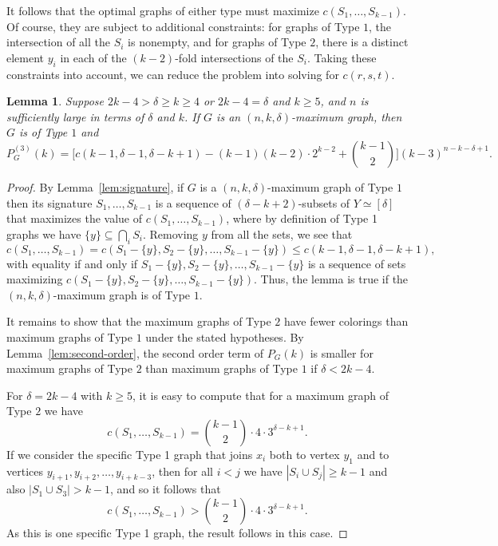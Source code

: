 \documentclass[11pt]{article}
\theoremstyle{plain}
\newtheorem{lemma}[theorem]{Lemma}
\theoremstyle{definition}
\theoremstyle{remark}
\begin{document}
It follows that the optimal graphs of either type must maximize $c(S_1,\ldots, S_{k-1})$. Of course, they are subject to additional constraints: for graphs of Type $1$, the intersection of all the $S_i$ is nonempty, and for graphs of Type $2$, there is a distinct element $y_i$ in each of the $(k-2)$-fold intersections of the $S_i$. Taking these constraints into account, we can reduce the problem into solving for $c(r,s,t)$.

\begin{lemma}\label{lem-mindegthirdorder}
 Suppose $2k-4 > \delta \ge k\ge 4$ or $2k-4=\delta$ and $k \geq 5$, and $n$ is sufficiently large in terms of $\delta$ and $k$. If $G$ is an $(n,k,\delta)$-maximum graph, then $G$ is of Type $1$ and
\[
P_G^{(3)}(k) = \Big[c(k-1, \delta - 1, \delta - k + 1) - (k-1)(k-2)\cdot 2^{k-2} + {k-1 \choose 2}\Big](k-3)^{n-k-\delta +1}.
\]
\end{lemma}
\begin{proof}
By Lemma~\ref{lem:signature}, if $G$ is a $(n,k, \delta)$-maximum graph of Type $1$ then its signature $S_1,\ldots, S_{k-1}$ is a sequence of $(\delta-k+2)$-subsets of $Y\simeq [\delta]$ that maximizes the value of $c(S_1,\ldots ,S_{k-1})$, where by definition of Type 1 graphs we have $\{y\} \subseteq \bigcap_i S_i$. Removing $y$ from all the sets, we see that
\[
c(S_1,\ldots ,S_{k-1}) = c(S_1 - \{y\}, S_2 - \{y\},\ldots, S_{k-1} - \{y\}) \le c(k-1, \delta-1, \delta - k + 1),
\]
with equality if and only if $S_1 - \{y\}, S_2 - \{y\},\ldots, S_{k-1} - \{y\}$ is a sequence of sets maximizing $c(S_1 - \{y\}, S_2 - \{y\},\ldots, S_{k-1} - \{y\})$. Thus, the lemma is true if the $(n,k,\delta)$-maximum graph is of Type $1$.

It remains to show that the maximum graphs of Type $2$ have fewer colorings than maximum graphs of Type $1$ under the stated hypotheses. By Lemma~\ref{lem:second-order}, the second order term of $P_G(k)$ is smaller for maximum graphs of Type $2$ than maximum graphs of Type $1$ if $\delta < 2k-4$.

For $\delta=2k-4$ with $k \geq 5$, it is easy to compute that for a maximum graph of Type $2$ we have 
\[
c(S_1,\ldots ,S_{k-1}) = {k-1 \choose 2} \cdot 4 \cdot 3^{\delta - k + 1}.
\]
If we consider the specific Type 1 graph that joins $x_i$ both to vertex $y_1$ and to vertices $y_{i+1}, y_{i+2},\ldots,y_{i+k-3}$, then for all $i<j$ we have $|S_i \cup S_j|\geq k-1$ and also $|S_1 \cup S_3| >k-1$, and so it follows that
\[
c(S_1,\ldots,S_{k-1}) > {k-1 \choose 2} \cdot 4 \cdot 3^{\delta - k + 1}.
\]
As this is one specific Type 1 graph, the result follows in this case.
\end{proof}
\end{document}
